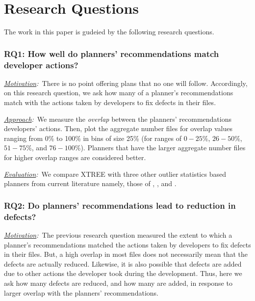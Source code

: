 \section{Research Questions}
\label{sect:rqs}
The work in this paper is gudeied by the following research questions.

\subsubsection*{RQ1: How well do planners' recommendations match developer actions?}
\compactlist
    \item[]\textit{\underline{Motivation}:}~There is no point offering plans that no one will follow.
    Accordingly, on this research question, we ask how many of a planner's recommendations match with the actions taken by developers to fix defects in their files.

    \item[]\textit{\underline{Approach}:}~We measure the \textit{overlap} between the planners' recommendations developers' actions. Then, plot the aggregate number files for overlap values ranging from 0\% to 100\% in bins of size 25\% (for ranges of $0-25\%$, $26-50\%$, $51-75\%$, and $76-100\%$). Planners that have the larger aggregate number files for higher overlap ranges are considered better.

    \item[]\textit{\underline{Evaluation}:}~We compare XTREE with three other outlier statistics based planners from current literature namely, those of \cite{alves}, \cite{shatnawi}, and \cite{oliveira}.
    \medskip
    \item[]
    \compactend
    
\subsubsection*{RQ2: Do planners' recommendations lead to reduction in defects?}
\compactlist
    \item[]\textit{\underline{Motivation}:}~The previous research question measured the extent to which a planner's recommendations matched the actions taken by developers to fix defects in their files. But, a high overlap in most files does not necessarily mean that the defects are actually reduced. Likewise, it is also possible that defects are added due to other actions the developer took during the development. Thus, here we ask how many defects are reduced, and how many are added, in response to larger overlap with the planners' recommendations.

